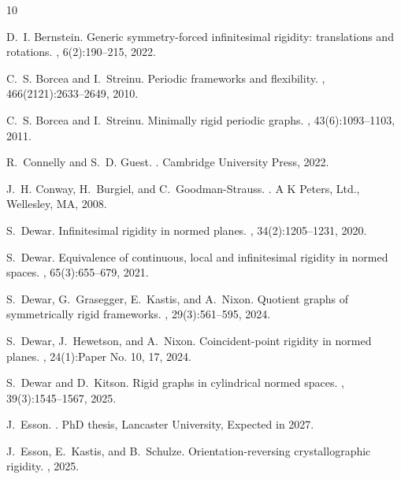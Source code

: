 \documentclass[reqno,a4paper,10pt]{article}
\theoremstyle{definition}
\theoremstyle{remark}
\numberwithin{equation}{section}
\numberwithin{figure}{section}
\numberwithin{table}{section}
\begin{document}
	
\begin{thebibliography}{10}

D.~I. Bernstein.
\newblock Generic symmetry-forced infinitesimal rigidity: translations and rotations.
, 6(2):190--215, 2022.

C.~S. Borcea and I.~Streinu.
\newblock Periodic frameworks and flexibility.
, 466(2121):2633--2649, 2010.

C.~S. Borcea and I.~Streinu.
\newblock Minimally rigid periodic graphs.
, 43(6):1093--1103, 2011.

R.~Connelly and S.~D. Guest.
.
\newblock Cambridge University Press, 2022.

J.~H. Conway, H.~Burgiel, and C.~Goodman-Strauss.
.
\newblock A K Peters, Ltd., Wellesley, MA, 2008.

S.~Dewar.
\newblock Infinitesimal rigidity in normed planes.
, 34(2):1205--1231, 2020.

S.~Dewar.
\newblock Equivalence of continuous, local and infinitesimal rigidity in normed spaces.
, 65(3):655--679, 2021.

S.~Dewar, G.~Grasegger, E.~Kastis, and A.~Nixon.
\newblock Quotient graphs of symmetrically rigid frameworks.
, 29(3):561--595, 2024.

S.~Dewar, J.~Hewetson, and A.~Nixon.
\newblock Coincident-point rigidity in normed planes.
, 24(1):Paper No. 10, 17, 2024.

S.~Dewar and D.~Kitson.
\newblock Rigid graphs in cylindrical normed spaces.
, 39(3):1545--1567, 2025.

J.~Esson.
.
\newblock PhD thesis, Lancaster University, Expected in 2027.

J.~Esson, E.~Kastis, and B.~Schulze.
\newblock Orientation-reversing crystallographic rigidity.
, 2025.


\end{thebibliography}
\end{document}
